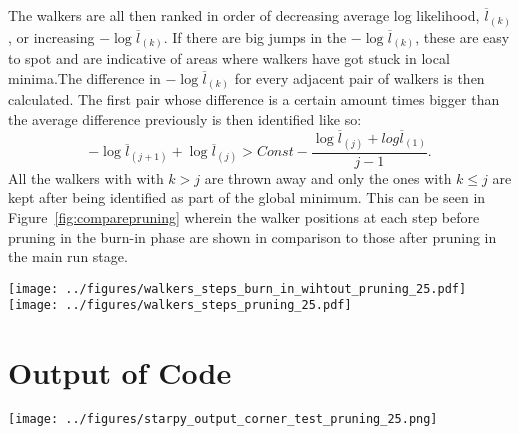 \documentclass[useAMS,usenatbib]{mn2e}
\begin{document}
The walkers are all then ranked in order of decreasing average log likelihood, $\overline{l}_{(k)}$, or increasing $- \log \overline{l}_{(k)}$. If there are big jumps in the $- \log \overline{l}_{(k)}$, these are easy to spot and are indicative of areas where walkers have got stuck in local minima.The difference in $- \log \overline{l}_{(k)}$ for every adjacent pair of walkers is then calculated. The first pair whose difference is a certain amount times bigger than the average difference previously is then identified like so:
\begin{equation}
-\log \overline{l}_{(j+1)} + \log \overline{l}_{(j)} > Const − \frac{\log \overline{l}_{(j)} + log \overline{l}_{(1)}}{j - 1}.
\end{equation}
All the walkers with with $k>j$ are thrown away and only the ones with $k \leq j$ are kept after being identified as part of the global minimum. This can be seen in Figure~\ref{fig:comparepruning} wherein the walker positions at each step before pruning in the burn-in phase are shown in comparison to those after pruning in the main run stage.

\begin{figure*}
\centering
\texttt{[image: ../figures/walkers\_steps\_burn\_in\_wihtout\_pruning\_25.pdf]}
\texttt{[image: ../figures/walkers\_steps\_pruning\_25.pdf]}
\caption{The positions traced by the \emph{emcee} walkers with step number (i.e. time) in each of the $[Z, t_q, \tau]$ dimensions during the burn in phase before pruning (left) and the post burn-in phase after pruning (right). The red lines show the known true values in each panel. Walkers have got stuck in local minima (see Figure±\ref{fig:localminima}) but some have managed to find the global minimum which can be seen more clearly in the right hand panels.}
\label{fig:comparepruning}
\end{figure*}


\section{Output of Code}\label{sec:output}


\begin{figure*}
\centering
\texttt{[image: ../figures/starpy\_output\_corner\_test\_pruning\_25.png]}
\caption{Example output from \textsc{starpies} showing the posterior probability function traced by the MCMC walkers across the three dimensional parameter space $[Z, t_q, \tau]$. Dashed lines show the 18th, 50th and 64th percentile of each distribution function which can be interpreted as the `best fit' with $±1\sigma$. The blue lines show the known true values which \textsc{starpies} has managed to recover.}
\label{fig:output}
\end{figure*}
\end{document}
